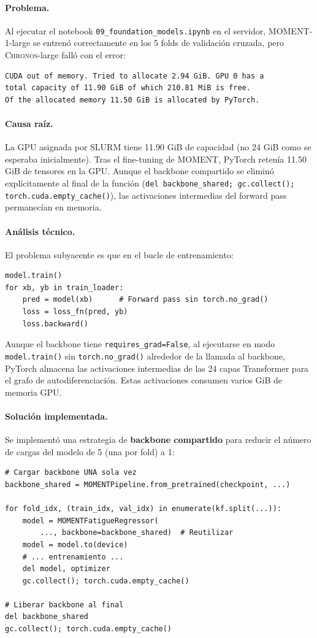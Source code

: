\documentclass[12pt, a4paper]{article}
\newcommand{\code}[1]{\texttt{#1}}
\newcommand{\moment}{\textsc{MOMENT}}
\newcommand{\chronos}{\textsc{Chronos}}
\begin{document}
\paragraph{Problema.}
Al ejecutar el notebook \code{09\_foundation\_models.ipynb} en el servidor, \moment{}-1-large se entrenó correctamente en los 5 folds de validación cruzada, pero \chronos{}-large falló con el error:

\begin{verbatim}
CUDA out of memory. Tried to allocate 2.94 GiB. GPU 0 has a
total capacity of 11.90 GiB of which 210.81 MiB is free.
Of the allocated memory 11.50 GiB is allocated by PyTorch.
\end{verbatim}

\paragraph{Causa raíz.}
La GPU asignada por SLURM tiene 11.90 GiB de capacidad (no 24 GiB como se esperaba inicialmente). Tras el fine-tuning de \moment{}, PyTorch retenía 11.50 GiB de tensores en la GPU. Aunque el backbone compartido se eliminó explícitamente al final de la función (\code{del backbone\_shared; gc.collect(); torch.cuda.empty\_cache()}), las activaciones intermedias del forward pass permanecían en memoria.

\paragraph{Análisis técnico.}
El problema subyacente es que en el bucle de entrenamiento:
\begin{lstlisting}
model.train()
for xb, yb in train_loader:
    pred = model(xb)      # Forward pass sin torch.no_grad()
    loss = loss_fn(pred, yb)
    loss.backward()
\end{lstlisting}
Aunque el backbone tiene \code{requires\_grad=False}, al ejecutarse en modo \code{model.train()} sin \code{torch.no\_grad()} alrededor de la llamada al backbone, PyTorch almacena las activaciones intermedias de las 24 capas Transformer para el grafo de autodiferenciación. Estas activaciones consumen varios GiB de memoria GPU.

\paragraph{Solución implementada.}
Se implementó una estrategia de \textbf{backbone compartido} para reducir el número de cargas del modelo de 5 (una por fold) a 1:
\begin{lstlisting}[caption={Backbone compartido en finetune\_moment\_kfold.}]
# Cargar backbone UNA sola vez
backbone_shared = MOMENTPipeline.from_pretrained(checkpoint, ...)

for fold_idx, (train_idx, val_idx) in enumerate(kf.split(...)):
    model = MOMENTFatigueRegressor(
        ..., backbone=backbone_shared)  # Reutilizar
    model = model.to(device)
    # ... entrenamiento ...
    del model, optimizer
    gc.collect(); torch.cuda.empty_cache()

# Liberar backbone al final
del backbone_shared
gc.collect(); torch.cuda.empty_cache()
\end{lstlisting}
\end{document}
